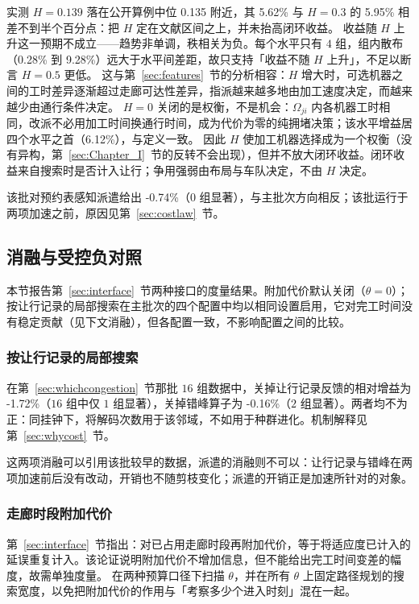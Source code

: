 \documentclass[manuscript,screen,review]{acmart}
\newcommand{\MatrixCells}{16}
\newcommand{\GainIntegMatrixLo}{0.28\%}
\newcommand{\GainIntegMatrixHi}{9.28\%}
\newcommand{\GainProbePre}{-0.74\%}      %
\newcommand{\GainCertMatrix}{-1.72\%}    %
\newcommand{\GainStaggerMatrix}{-0.16\%} %
\newcommand{\GainIntegHZero}{6.12\%}
\newcommand{\GainIntegHLow}{5.62\%}      %
\newcommand{\GainIntegHMid}{5.95\%}      %
\newcommand{\MatrixHMeasLow}{0.139}      %
\newcommand{\PubHMed}{0.135}             %
\begin{document}
实测 $H=\MatrixHMeasLow$ 落在公开算例中位 \PubHMed{} 附近，其 \GainIntegHLow{} 与 $H=0.3$ 的 \GainIntegHMid{} 相差不到半个百分点：把 $H$ 定在文献区间之上，并未抬高闭环收益。
收益随 $H$ 上升这一预期不成立——趋势非单调，秩相关为负。每个水平只有 $4$ 组，组内散布（\GainIntegMatrixLo{} 到 \GainIntegMatrixHi{}）远大于水平间差距，故只支持「收益不随 $H$ 上升」，不足以断言 $H=0.5$ 更低。
这与第~\ref{sec:features}~节的分析相容：$H$ 增大时，可选机器之间的工时差异逐渐超过走廊可达性差异，指派越来越多地由加工速度决定，而越来越少由通行条件决定。
$H=0$ 关闭的是权衡，不是机会：$\Omega_{ji}$ 内各机器工时相同，改派不必用加工时间换通行时间，成为代价为零的纯拥堵决策；该水平增益居四个水平之首（\GainIntegHZero{}），与定义一致。
因此 $H$ 使加工机器选择成为一个权衡（没有异构，第~\ref{sec:Chapter_I}~节的反转不会出现），但并不放大闭环收益。闭环收益来自搜索时是否计入让行；争用强弱由布局与车队决定，不由 $H$ 决定。

该批对预约表感知派遣给出 \GainProbePre{}（$0$ 组显著），与主批次方向相反；该批运行于两项加速之前，原因见第~\ref{sec:costlaw}~节。

\subsection{消融与受控负对照}
\label{sec:pricing}

本节报告第~\ref{sec:interface}~节两种接口的度量结果。附加代价默认关闭（$\theta=0$）；按让行记录的局部搜索在主批次的四个配置中均以相同设置启用，它对完工时间没有稳定贡献（见下文消融），但各配置一致，不影响配置之间的比较。

\subsubsection{按让行记录的局部搜索}
在第~\ref{sec:whichcongestion}~节那批 $\MatrixCells$ 组数据中，关掉让行记录反馈的相对增益为 \GainCertMatrix{}（$\MatrixCells$ 组中仅 $1$ 组显著），关掉错峰算子为 \GainStaggerMatrix{}（$2$ 组显著）。两者均不为正：同挂钟下，将解码次数用于该邻域，不如用于种群进化。机制解释见第~\ref{sec:whycost}~节。

这两项消融可以引用该批较早的数据，派遣的消融则不可以：让行记录与错峰在两项加速前后没有改动，开销也不随剪枝变化；派遣的开销正是加速所针对的对象。

\subsubsection{走廊时段附加代价}
第~\ref{sec:interface}~节指出：对已占用走廊时段再附加代价，等于将适应度已计入的延误重复计入。该论证说明附加代价不增加信息，但不能给出完工时间变差的幅度，故需单独度量。
在两种预算口径下扫描 $\theta$，并在所有 $\theta$ 上固定路径规划的搜索宽度，以免把附加代价的作用与「考察多少个进入时刻」混在一起。
\end{document}
